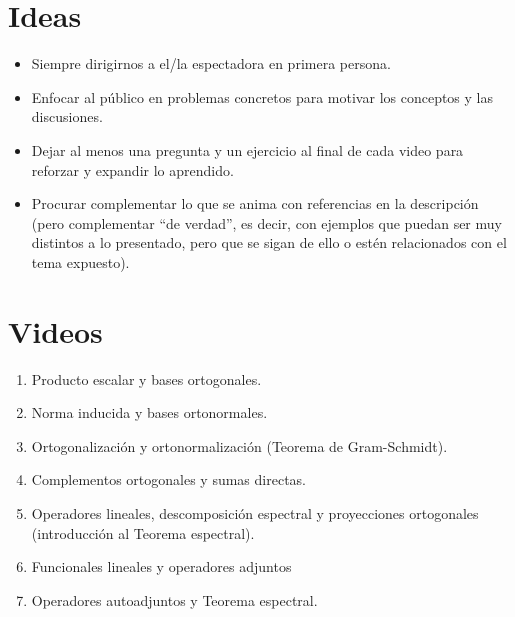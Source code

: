 \documentclass[12pt,dvipsnames]{article}
\numberwithin{equation}{section}
\begin{document}
\section{Ideas}

\begin{itemize}
    \item Siempre dirigirnos a el/la espectadora en primera persona.
    \item Enfocar al público en problemas concretos para motivar los conceptos y las discusiones.
    \item Dejar al menos una pregunta y un ejercicio al final de cada video para reforzar y expandir lo aprendido.
    \item Procurar complementar lo que se anima con referencias en la descripción (pero complementar ``de verdad'', es decir, con ejemplos que puedan ser muy distintos a lo presentado, pero que se sigan de ello o estén relacionados con el tema expuesto).
\end{itemize}

\section{Videos}

\begin{enumerate}
    \item Producto escalar y bases ortogonales.
    \item Norma inducida y bases ortonormales.
    \item Ortogonalización y ortonormalización (Teorema de Gram-Schmidt).
    \item Complementos ortogonales y sumas directas.
    \item Operadores lineales, descomposición espectral y proyecciones ortogonales (introducción al Teorema espectral).
    \item Funcionales lineales y operadores adjuntos
    \item Operadores autoadjuntos y Teorema espectral.
\end{enumerate}
\end{document}

